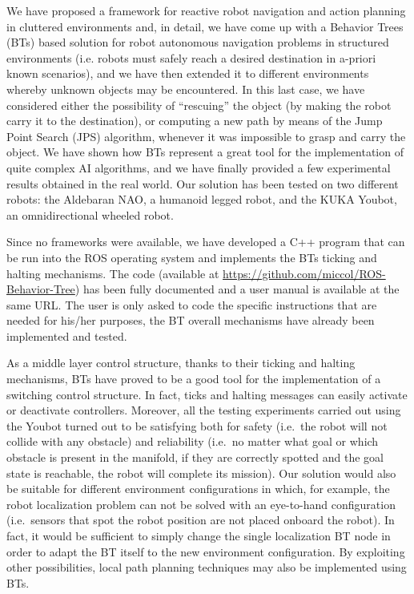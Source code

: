 \documentclass[12pt, a4paper]{article}
\begin{document}
We have proposed a framework for reactive robot navigation and action planning in cluttered environments and, in detail, we have come up with a Behavior Trees (BTs) based solution for robot autonomous navigation problems in structured environments (i.e. robots must safely reach a desired destination in a-priori known scenarios), and we have then extended it to different environments whereby unknown objects may be encountered. In this last case, we have considered either the possibility of ``rescuing'' the object (by making the robot carry it to the destination), or computing a new path by means of the Jump Point Search (JPS) algorithm, whenever it was impossible to grasp and carry the object. We have shown how BTs represent a great tool for the implementation of quite complex AI algorithms, and we have finally provided a few experimental results obtained in the real world. Our solution has been tested on two different robots: the Aldebaran NAO, a humanoid legged robot, and the KUKA Youbot, an omnidirectional wheeled robot. \par
Since no frameworks were available, we have developed a C++ program that can be run into the ROS operating system and implements the BTs ticking and halting mechanisms. The code (available at \href{https://github.com/miccol/ROS-Behavior-Tree}{https://github.com/miccol/ROS-Behavior-Tree}) has been fully documented and a user manual is available at the same URL. The user is only asked to code the specific instructions that are needed for his/her purposes, the BT overall mechanisms have already been implemented and tested. \par
As a middle layer control structure, thanks to their ticking and halting mechanisms, BTs have proved to be a good tool for the implementation of a switching control structure. In fact, ticks and halting messages can easily activate or deactivate controllers. Moreover, all the testing experiments carried out using the Youbot turned out to be satisfying both for safety (i.e.\ the robot will not collide with any obstacle) and reliability (i.e.\ no matter what goal or which obstacle is present in the manifold, if they are correctly spotted and the goal state is reachable, the robot will complete its mission). Our solution would also be suitable for different environment configurations in which, for example, the robot localization problem can not be solved with an eye-to-hand configuration (i.e.\ sensors that spot the robot position are not placed onboard the robot). In fact, it would be sufficient to simply change the single localization BT node in order to adapt the BT itself to the new environment configuration. By exploiting other possibilities, local path planning techniques may also be implemented using BTs. \par
\end{document}
